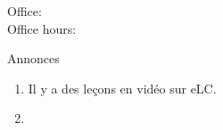 \documentclass{beamer}
\subtitle[Il y a, c'est, ce sont]{Il y a, c'est, ce sont}
\begin{document}
  \begin{frame}
    \titlepage
    \tiny{Office: \\
          Office hours: }
  \end{frame}

  \begin{frame}{Annonces }
    \begin{enumerate}
      \item Il y a des leçons en vidéo sur eLC.
      \item[] 
    \end{enumerate}
  \end{frame}

\end{document}
